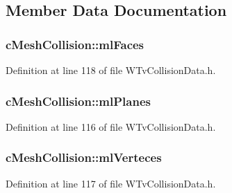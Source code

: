 \subsection{Member Data Documentation}
\hypertarget{classc_mesh_collision_a0717da906fc411fac3a9f7dbe988800d}{
\subsubsection[{mlFaces}]{ {\bf cMeshCollision::mlFaces}}}
\label{classc_mesh_collision_a0717da906fc411fac3a9f7dbe988800d}


Definition at line 118 of file WTvCollisionData.h.

\hypertarget{classc_mesh_collision_a578fa0a23130f901afaa3b38cb07f061}{
\subsubsection[{mlPlanes}]{ {\bf cMeshCollision::mlPlanes}}}
\label{classc_mesh_collision_a578fa0a23130f901afaa3b38cb07f061}


Definition at line 116 of file WTvCollisionData.h.

\hypertarget{classc_mesh_collision_a7d24a9baa9afd31ba7f63a11f417877b}{
\subsubsection[{mlVerteces}]{ {\bf cMeshCollision::mlVerteces}}}
\label{classc_mesh_collision_a7d24a9baa9afd31ba7f63a11f417877b}


Definition at line 117 of file WTvCollisionData.h.

